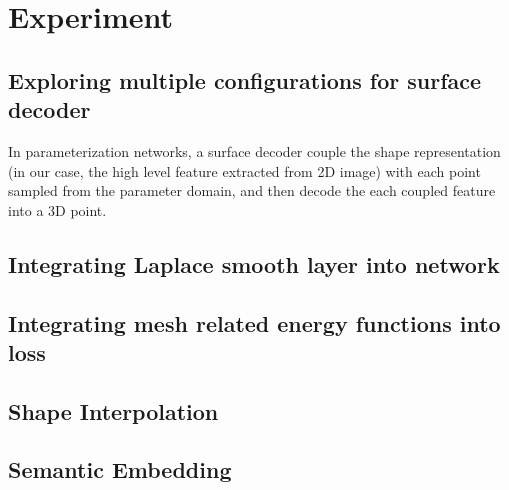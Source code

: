 \section{Experiment}
\subsection{Exploring multiple configurations for surface decoder}
In parameterization networks, a surface decoder couple the shape representation (in our case, the high level feature extracted from 2D image) with each point sampled from the parameter domain, and then decode the each coupled feature into a 3D point. 

\subsection{Integrating Laplace smooth layer into network}

\subsection{Integrating mesh related energy functions into loss}

\subsection{Shape Interpolation}

\subsection{Semantic Embedding}
